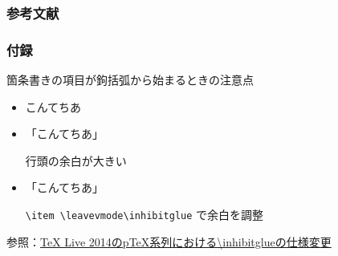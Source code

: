 \documentclass[12pt]{beamer}
\renewcommand\appendixname{付録}
\begin{document}
\begin{frame}
\frametitle{参考文献}
\footnotesize


\end{frame}

\appendix
\begin{frame}
    \footnotesize
    \frametitle{\appendixname}
    箇条書きの項目が鉤括弧から始まるときの注意点
    \begin{itemize}
        \item こんてちあ
        \item 「こんてちあ」

            行頭の余白が大きい
        \item \leavevmode\inhibitglue 「こんてちあ」

            \texttt{\textbackslash item \textbackslash leavevmode\textbackslash inhibitglue} で余白を調整
    \end{itemize}

    \bigskip

    参照：\href{http://doratex.hatenablog.jp/entry/20140714/1405302796}{TeX Live 2014のpTeX系列における\textbackslash inhibitglueの仕様変更}
\end{frame}
\end{document}
